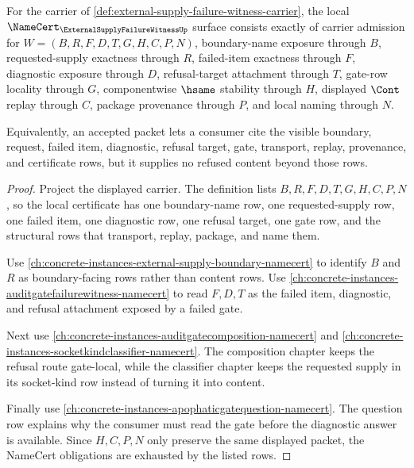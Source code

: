 \begin{theorem}
\label{thm:external-supply-failure-witness-namecert-obligations}
For the carrier of \autoref{def:external-supply-failure-witness-carrier}, the local $\NameCert_{\ExternalSupplyFailureWitnessUp}$ surface consists exactly of carrier admission for $W=(B,R,F,D,T,G,H,C,P,N)$, boundary-name exposure through $B$, requested-supply exactness through $R$, failed-item exactness through $F$, diagnostic exposure through $D$, refusal-target attachment through $T$, gate-row locality through $G$, componentwise $\hsame$ stability through $H$, displayed $\Cont$ replay through $C$, package provenance through $P$, and local naming through $N$.

Equivalently, an accepted packet lets a consumer cite the visible boundary, request, failed item, diagnostic, refusal target, gate, transport, replay, provenance, and certificate rows, but it supplies no refused content beyond those rows.
\end{theorem}
\begin{proof}
Project the displayed carrier. The definition lists $B,R,F,D,T,G,H,C,P,N$, so the local certificate has one boundary-name row, one requested-supply row, one failed item, one diagnostic row, one refusal target, one gate row, and the structural rows that transport, replay, package, and name them.

Use \autoref{ch:concrete-instances-external-supply-boundary-namecert} to identify $B$ and $R$ as boundary-facing rows rather than content rows. Use \autoref{ch:concrete-instances-auditgatefailurewitness-namecert} to read $F,D,T$ as the failed item, diagnostic, and refusal attachment exposed by a failed gate.

Next use \autoref{ch:concrete-instances-auditgatecomposition-namecert} and \autoref{ch:concrete-instances-socketkindclassifier-namecert}. The composition chapter keeps the refusal route gate-local, while the classifier chapter keeps the requested supply in its socket-kind row instead of turning it into content.

Finally use \autoref{ch:concrete-instances-apophaticgatequestion-namecert}. The question row explains why the consumer must read the gate before the diagnostic answer is available. Since $H,C,P,N$ only preserve the same displayed packet, the NameCert obligations are exhausted by the listed rows.
\end{proof}

